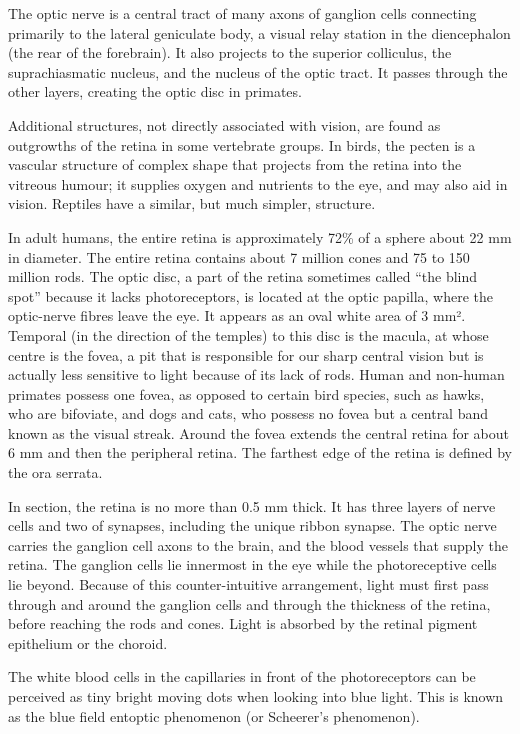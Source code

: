 The optic nerve is a central tract of many axons of ganglion cells connecting primarily to the lateral geniculate body, a visual relay station in the diencephalon (the rear of the forebrain). It also projects to the superior colliculus, the suprachiasmatic nucleus, and the nucleus of the optic tract. It passes through the other layers, creating the optic disc in primates.

Additional structures, not directly associated with vision, are found as outgrowths of the retina in some vertebrate groups. In birds, the pecten is a vascular structure of complex shape that projects from the retina into the vitreous humour; it supplies oxygen and nutrients to the eye, and may also aid in vision. Reptiles have a similar, but much simpler, structure.

In adult humans, the entire retina is approximately 72\% of a sphere about 22 mm in diameter. The entire retina contains about 7 million cones and 75 to 150 million rods. The optic disc, a part of the retina sometimes called ``the blind spot'' because it lacks photoreceptors, is located at the optic papilla, where the optic-nerve fibres leave the eye. It appears as an oval white area of 3 mm². Temporal (in the direction of the temples) to this disc is the macula, at whose centre is the fovea, a pit that is responsible for our sharp central vision but is actually less sensitive to light because of its lack of rods. Human and non-human primates possess one fovea, as opposed to certain bird species, such as hawks, who are bifoviate, and dogs and cats, who possess no fovea but a central band known as the visual streak. Around the fovea extends the central retina for about 6 mm and then the peripheral retina. The farthest edge of the retina is defined by the ora serrata.

In section, the retina is no more than 0.5 mm thick. It has three layers of nerve cells and two of synapses, including the unique ribbon synapse. The optic nerve carries the ganglion cell axons to the brain, and the blood vessels that supply the retina. The ganglion cells lie innermost in the eye while the photoreceptive cells lie beyond. Because of this counter-intuitive arrangement, light must first pass through and around the ganglion cells and through the thickness of the retina, before reaching the rods and cones. Light is absorbed by the retinal pigment epithelium or the choroid.

The white blood cells in the capillaries in front of the photoreceptors can be perceived as tiny bright moving dots when looking into blue light. This is known as the blue field entoptic phenomenon (or Scheerer's phenomenon).

